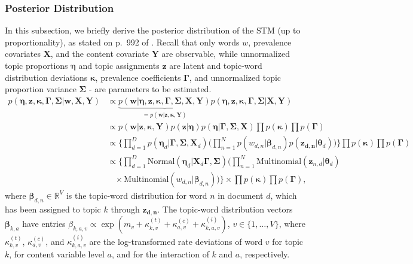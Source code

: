 \subsubsection*{Posterior Distribution}

In this subsection, we briefly derive the posterior distribution of the STM (up to proportionality), as stated on p.\ 992 of \cite{roberts2016model}. Recall that only words $w$, prevalence covariates $\boldsymbol{X}$, and the content covariate $\boldsymbol{Y}$ are observable, while unnormalized topic proportions $\boldsymbol{\eta}$ and topic assignments $\boldsymbol{z}$ are latent and topic-word distribution deviations $\boldsymbol{\kappa}$, prevalence coefficients $\boldsymbol{\Gamma}$, and unnormalized topic proportion variance $\boldsymbol{\Sigma}$ - are parameters to be estimated.
\begin{align*}
p(\boldsymbol{\eta}, \boldsymbol{z}, \boldsymbol{\kappa}, \boldsymbol{\Gamma}, \boldsymbol{\Sigma} | \boldsymbol{w}, \boldsymbol{X}, \boldsymbol{Y}) & \propto \underbrace{p(\boldsymbol{w} | \boldsymbol{\eta}, \boldsymbol{z}, \boldsymbol{\kappa}, \boldsymbol{\Gamma}, \boldsymbol{\Sigma}, \boldsymbol{X}, \boldsymbol{Y})}_{=p(\boldsymbol{w} | \boldsymbol{z}, \boldsymbol{\kappa}, \boldsymbol{Y})} p(\boldsymbol{\eta}, \boldsymbol{z}, \boldsymbol{\kappa}, \boldsymbol{\Gamma}, \boldsymbol{\Sigma} | \boldsymbol{X}, \boldsymbol{Y}) \\
& \propto p(\boldsymbol{w} | \boldsymbol{z}, \boldsymbol{\kappa}, \boldsymbol{Y}) p(\boldsymbol{z} | \boldsymbol{\eta}) p(\boldsymbol{\eta} | \boldsymbol{\Gamma}, \boldsymbol{\Sigma}, \boldsymbol{X}) \prod p(\boldsymbol{\kappa}) \prod p(\boldsymbol{\Gamma}) \\
& \propto \Big\{ \prod_{d=1}^{D} p(\boldsymbol{\eta}_d | \boldsymbol{\Gamma}, \boldsymbol{\Sigma}, \boldsymbol{X}_d) \Big( \prod_{n=1}^{N} p(w_{d,n} | \boldsymbol{\beta}_{d, n}) p(\boldsymbol{z_{d,n}} | \boldsymbol{\theta}_d) \Big) \Big\} \prod p(\boldsymbol{\kappa}) \prod p(\boldsymbol{\Gamma}) \\
& \propto \Big\{ \prod_{d=1}^{D} \text{Normal}(\boldsymbol{\eta}_d | \boldsymbol{X}_d \boldsymbol{\Gamma}, \boldsymbol{\Sigma}) \Big( \prod_{n=1}^{N} \text{Multinomial}(\boldsymbol{z}_{n,d}| \boldsymbol{\theta}_d) \\
& \ \ \ \ \times \text{Multinomial}(w_{d,n} | \boldsymbol{\beta}_{d,n}) \Big) \Big\} \times \prod p(\boldsymbol{\kappa}) \prod p(\boldsymbol{\Gamma}),
\end{align*}
where $\boldsymbol{\beta}_{d, n} \in \mathbb{R}^V$ is the topic-word distribution for word $n$ in document $d$, which has been assigned to topic $k$ through $\boldsymbol{z_{d,n}}$. The topic-word distribution vectors $\boldsymbol{\beta}_{k,a}$ have entries $\beta_{k,a,v} \propto \exp(m_{v} + \kappa_{k,v}^{(t)} + \kappa_{a,v}^{(c)} + \kappa_{k, a,v}^{(i)})$, $v \in \{1,\dots,V\}$, where $\kappa_{k,v}^{(t)}$, $\kappa_{a,v}^{(c)}$, and $\kappa_{k, a,v}^{(i)}$ are the log-transformed rate deviations of word $v$ for topic $k$, for content variable level $a$, and for the interaction of $k$ and $a$, respectively.

